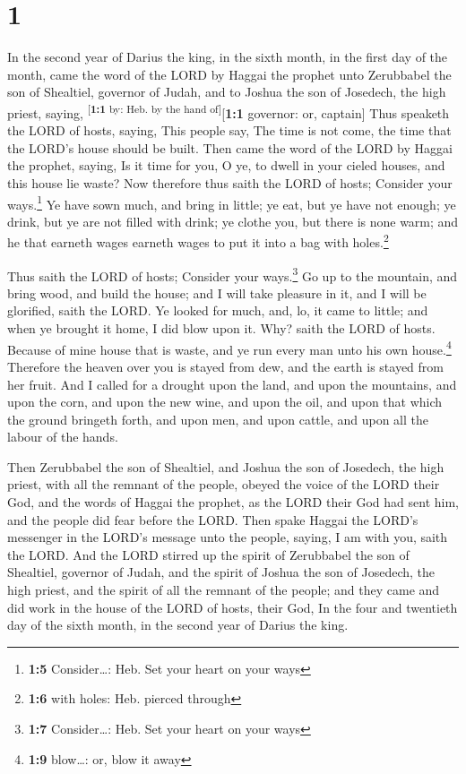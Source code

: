 \hypertarget{section}{%
\section{1}\label{section}}

 In the second year of Darius the king, in the sixth
month, in the first day of the month, came the word of the LORD by
Haggai the prophet unto Zerubbabel the son of Shealtiel, governor of
Judah, and to Joshua the son of Josedech, the high priest, saying,
\textsuperscript{{[}\textbf{1:1} by: Heb. by the hand
of{]}}{[}\textbf{1:1} governor: or, captain{]}  Thus
speaketh the LORD of hosts, saying, This people say, The time is not
come, the time that the LORD's house should be built. 
Then came the word of the LORD by Haggai the prophet, saying,
 Is it time for you, O ye, to dwell in your cieled houses,
and this house lie waste?  Now therefore thus saith the
LORD of hosts; Consider your ways.\footnote{\textbf{1:5} Consider\ldots:
  Heb. Set your heart on your ways}  Ye have sown much,
and bring in little; ye eat, but ye have not enough; ye drink, but ye
are not filled with drink; ye clothe you, but there is none warm; and he
that earneth wages earneth wages to put it into a bag with
holes.\footnote{\textbf{1:6} with holes: Heb. pierced through}

 Thus saith the LORD of hosts; Consider your
ways.\footnote{\textbf{1:7} Consider\ldots: Heb. Set your heart on your
  ways}  Go up to the mountain, and bring wood, and build
the house; and I will take pleasure in it, and I will be glorified,
saith the LORD.  Ye looked for much, and, lo, it came to
little; and when ye brought it home, I did blow upon it. Why? saith the
LORD of hosts. Because of mine house that is waste, and ye run every man
unto his own house.\footnote{\textbf{1:9} blow\ldots: or, blow it away}
 Therefore the heaven over you is stayed from dew, and
the earth is stayed from her fruit.  And I called for a
drought upon the land, and upon the mountains, and upon the corn, and
upon the new wine, and upon the oil, and upon that which the ground
bringeth forth, and upon men, and upon cattle, and upon all the labour
of the hands.

 Then Zerubbabel the son of Shealtiel, and Joshua the son
of Josedech, the high priest, with all the remnant of the people, obeyed
the voice of the LORD their God, and the words of Haggai the prophet, as
the LORD their God had sent him, and the people did fear before the
LORD.  Then spake Haggai the LORD's messenger in the
LORD's message unto the people, saying, I am with you, saith the LORD.
 And the LORD stirred up the spirit of Zerubbabel the son
of Shealtiel, governor of Judah, and the spirit of Joshua the son of
Josedech, the high priest, and the spirit of all the remnant of the
people; and they came and did work in the house of the LORD of hosts,
their God,  In the four and twentieth day of the sixth
month, in the second year of Darius the king.

